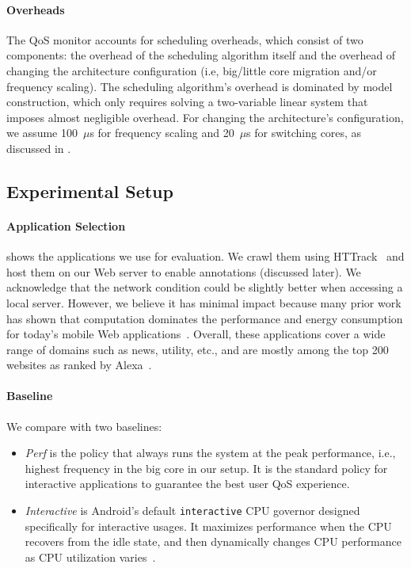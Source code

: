 \paragraph{Overheads} The QoS monitor accounts for scheduling overheads, which consist of two components: the overhead of the scheduling algorithm itself and the overhead of changing the architecture configuration (i.e, big/little core migration and/or frequency scaling). The scheduling algorithm's overhead is dominated by model construction, which only requires solving a two-variable linear system that imposes almost negligible overhead. For changing the architecture's configuration, we assume 100~$\mu$s for frequency scaling and 20~$\mu$s for switching cores, as discussed in .

\subsection{Experimental Setup}
\paragraph{Application Selection}  shows the applications we use for evaluation. We crawl them using HTTrack~\cite{httrack} and host them on our Web server to enable annotations (discussed later). We acknowledge that the network condition could be slightly better when accessing a local server. However, we believe it has minimal impact because many prior work has shown that computation dominates the performance and energy consumption for today's mobile Web applications~\cite{zhu2015role,huang2012close,big-little}. Overall, these applications cover a wide range of domains such as news, utility, etc., and are mostly among the top 200 websites as ranked by Alexa~\cite{alexa}.

\paragraph{Baseline} We compare \ebs with two baselines:
\begin{itemize}
  \item \textit{Perf} is the policy that always runs the system at the peak performance, i.e., highest frequency in the big core in our setup. It is the standard policy for interactive applications to guarantee the best user QoS experience.
  
  \item \textit{Interactive} is Android's default \texttt{interactive} CPU governor designed specifically for interactive usages. It maximizes performance when the CPU recovers from the idle state, and then dynamically changes CPU performance as CPU utilization varies~\cite{android_cpufreq}.
\end{itemize}

